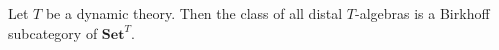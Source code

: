 Let $T$ be a dynamic theory. Then the class of all distal $T$-algebras is a Birkhoff subcategory of $\mathbf{Set}^T$.

